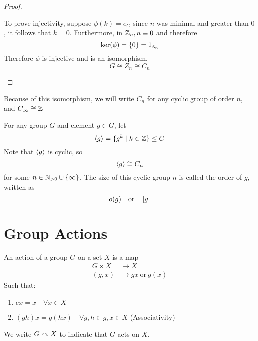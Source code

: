 \documentclass{article}
\begin{document}
\begin{proof}
\begin{enumerate}[cases]
        To prove injectivity, suppose $\phi(k) = e_G$ since $n$ was minimal and greater than $0$, it follows that $k = 0$. Furthermore, in $\mathbb{Z}_n, n \equiv 0$ and therefore
        \[
            \ker(\phi) = \{0\} = 1_{\mathbb{Z}_n}  
        \]
        Therefore $\phi$ is injective and is an isomorphism.
        \[
            G \cong Z_n \cong C_n  
        \]
    \end{enumerate}
\end{proof}

\begin{remark}
    Because of this isomorphism, we will write $C_n$ for any cyclic group of order $n$, and $C_\infty \cong \mathbb{Z}$ 
\end{remark}

\begin{defi}
    For any group $G$ and element $g \in G$, let
    \[
        \left\langle g\right\rangle = \{g^k \mid k \in \mathbb{Z}\} \leq G  
    \]
    Note that $\left\langle g\right\rangle$ is cyclic, so
    \[
        \left\langle g\right\rangle \cong C_n    
    \]
    for some $n \in \mathbb{N}_{>0} \cup \{\infty\}$. The size of this cyclic group $n$ is called the order of $g$, written as
    \[
        o(g) \quad \text{or} \quad \left\lvert g\right\rvert  
    \]
\end{defi}


\section{Group Actions}

\begin{defi}
    An action of a group $G$ on a set $X$ is a map
    \begin{align*}
        G \times X &\rightarrow X \\
        (g, x) &\mapsto gx \ \text{or} \ g(x)
    \end{align*}
    Such that:
    \begin{enumerate}
        \item $ex = x \quad \forall x \in X$
        \item $(gh)x = g(hx) \quad \forall g, h \in g, x \in X$ \hspace*{\fill}(Associativity)
    \end{enumerate}
    We write $G \curvearrowright X$ to indicate that $G$ acts on $X$.
\end{defi}
\end{document}
